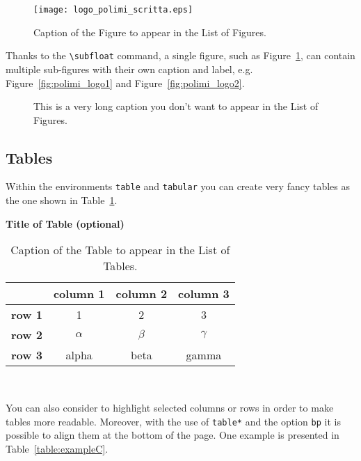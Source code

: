 \documentclass{Configuration_Files/PoliMi3i_thesis}
\begin{document}
\begin{figure}[H]
    \centering
    \texttt{[image: logo\_polimi\_scritta.eps]}
    \caption{Caption of the Figure to appear in the List of Figures.}
    \label{fig:quadtree}
\end{figure}

Thanks to the \texttt{\textbackslash subfloat} command, a single figure, such as Figure~\ref{fig:quadtree},
can contain multiple sub-figures with their own caption and label, e.g. \color{black} Figure~\ref{fig:polimi_logo1} and Figure~\ref{fig:polimi_logo2}. 

\begin{figure}[H]
    \centering
    \quad
    \caption{This is a very long caption you don't want to appear in the List of Figures.}
    \label{fig:quadtree2}
\end{figure}


\subsection{Tables}
\label{subsec:tables}

Within the environments \texttt{table} and  \texttt{tabular} you can create very fancy tables as the one shown in Table~\ref{table:example}.
\begin{table}[H]
    \caption*{\textbf{Title of Table (optional)}}
    \centering 
    \begin{tabular}{|p{3em} c c c |}
    \hline
    \rowcolor{bluepoli!40} %
     & \textbf{column 1} & \textbf{column 2} & \textbf{column 3} \T\B \\
    \hline \hline
    \textbf{row 1} & 1 & 2 & 3 \T\B \\
    \textbf{row 2} & $\alpha$ & $\beta$ & $\gamma$ \T\B\\
    \textbf{row 3} & alpha & beta & gamma \B\\
    \hline
    \end{tabular}
    \\[10pt]
    \caption{Caption of the Table to appear in the List of Tables.}
    \label{table:example}
\end{table}

You can also consider to highlight selected columns or rows in order to make tables more readable.
Moreover, with the use of \texttt{table*} and the option \texttt{bp} it is possible to align them at the bottom of the page. One example is presented in Table~\ref{table:exampleC}. 
\end{document}
